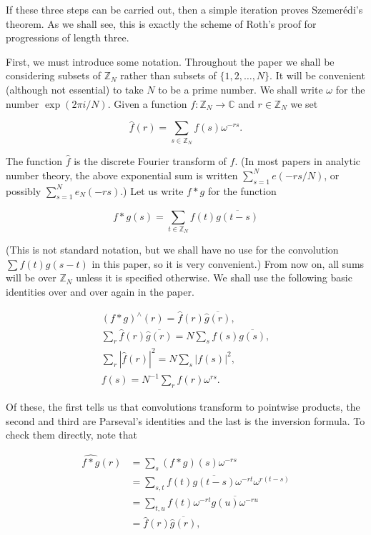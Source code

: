 \documentclass[10pt]{article}
\begin{document}
If these three steps can be carried out, then a simple iteration proves Szemerédi's theorem. As we shall see, this is exactly the scheme of Roth's proof for progressions of length three.

First, we must introduce some notation. Throughout the paper we shall be considering subsets of $\mathbb{Z}_{N}$ rather than subsets of $\{1,2, \ldots, N\}$. It will be convenient (although not essential) to take $N$ to be a prime number. We shall write $\omega$ for the number $\exp (2 \pi i / N)$. Given a function $f: \mathbb{Z}_{N} \rightarrow \mathbb{C}$ and $r \in \mathbb{Z}_{N}$ we set

$$
\hat{f}(r)=\sum_{s \in \mathbb{Z}_{N}} f(s) \omega^{-r s} .
$$

The function $\hat{f}$ is the discrete Fourier transform of $f$. (In most papers in analytic number theory, the above exponential sum is written $\sum_{s=1}^{N} e(-r s / N)$, or possibly $\sum_{s=1}^{N} e_{N}(-r s)$.) Let us write $f * g$ for the function

$$
f * g(s)=\sum_{t \in \mathbb{Z}_{N}} f(t) \overline{g(t-s)}
$$

(This is not standard notation, but we shall have no use for the convolution $\sum f(t) g(s-t)$ in this paper, so it is very convenient.) From now on, all sums will be over $\mathbb{Z}_{N}$ unless it is specified otherwise. We shall use the following basic identities over and over again in the paper.


\begin{gather*}
(f * g)^{\wedge}(r)=\hat{f}(r) \overline{\hat{g}(r)},  \tag{1}\\
\sum_{r} \hat{f}(r) \overline{\hat{g}(r)}=N \sum_{s} f(s) \overline{g(s)},  \tag{2}\\
\sum_{r}|\hat{f}(r)|^{2}=N \sum_{s}|f(s)|^{2},  \tag{3}\\
f(s)=N^{-1} \sum_{r} \hat{f}(r) \omega^{r s} . \tag{4}
\end{gather*}


Of these, the first tells us that convolutions transform to pointwise products, the second and third are Parseval's identities and the last is the inversion formula. To check them directly, note that

$$
\begin{aligned}
\widehat{f * g}(r) & =\sum_{s}(f * g)(s) \omega^{-r s} \\
& =\sum_{s, t} f(t) \overline{g(t-s)} \omega^{-r t} \omega^{r(t-s)} \\
& =\sum_{t, u} f(t) \omega^{-r t} \overline{g(u) \omega^{-r u}} \\
& =\hat{f}(r) \overline{\hat{g}(r)},
\end{aligned}
$$
\end{document}
